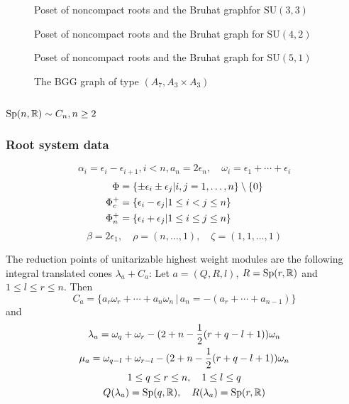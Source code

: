\begin{figure}[h]
  \centering 
	\resizebox{\textwidth}{!}{
   
	 
	}
  \caption{Poset of noncompact roots and the Bruhat graphfor $\mathrm{SU}(3,3)$}
\end{figure} 

\begin{figure}[h]
  \centering 
   
	 
  \caption{Poset of noncompact roots and the Bruhat graph for $\mathrm{SU}(4,2)$}
\end{figure} 

\begin{figure}[h]
  \centering 
  
	
  \caption{Poset of noncompact roots and the Bruhat graph for $\mathrm{SU}(5,1)$}
\end{figure} 


\begin{figure}[h]
  \centering 
  
  \caption{The BGG graph of type $(A_7,A_3\times A_3)$}
\end{figure} 

\clearpage

\subsection[Sp(n,R)]{$\mathrm{Sp}(n,\mathbb{R}) \sim C_n, n \geq 2$}

\subsubsection{Root system data}

\[ \alpha_i = \epsilon_i - \epsilon_{i+1}, i< n,a_n = 2\epsilon_n, \quad \omega_i=\epsilon_1+\cdots+\epsilon_i\]
\begin{align*}
 \Phi &= \{\pm \epsilon_i \pm \epsilon_j | i,j = 1,\ldots, n \}\setminus\{0\}\\
 \Phi_c^+ &= \{ \epsilon_i-\epsilon_j | 1\leq i < j \leq  n\}\\
 \Phi_n^+ &= \{ \epsilon_i + \epsilon_j | 1 \leq i \leq  j \leq n \}
\end{align*}
\[\beta = 2\epsilon_1,\quad \rho = (n,\ldots ,1),\quad \zeta = (1,1,\ldots,1)\]

The reduction points of unitarizable highest weight modules are the following integral translated cones $\lambda_a + C_a$:
Let $a=(Q,R,l)$, $R=\mathrm{Sp}(r,\mathbb{R})$ and $1\leq l \leq r \leq n$. Then
\[
 C_a = \{ a_r\omega_r + \cdots + a_n\omega_n \,|\, a_n=-(a_r+\cdots + a_{n-1}) \}
\]
and
\begin{gather*}
  \lambda_a = \omega_q + \omega_r - (2+n-\frac{1}{2}(r+q-l+1))\omega_n\\
  \mu_a= \omega_{q-l} + \omega_{r-l} - (2+n-\frac{1}{2}(r+q-l+1))\omega_n\\
   1\leq q\leq r\leq n,\quad 1\leq l \leq q\\
   Q(\lambda_a) = \mathrm{Sp}(q,\mathbb{R}),\quad R(\lambda_a)= \mathrm{Sp}(r,\mathbb{R})
\end{gather*}

